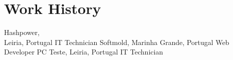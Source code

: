 \section[\faGears]{Work History}
    {Hashpower,\\Leiria, Portugal}
    {IT Technician}
    {}
    {Softmold, Marinha Grande, Portugal}
    {Web Developer}
    {}
    {PC Teste, Leiria, Portugal}
    {IT Technician}
    {}
